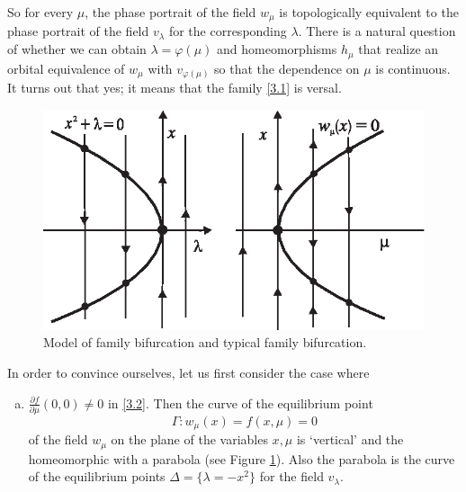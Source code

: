 \begin{example}
	So for every $\mu $, the phase portrait of the field $w_{\mu }$ is topologically equivalent to the phase portrait of the field $v_{\lambda }$ for the corresponding $\lambda$. There is a natural question of whether we can obtain $\lambda =\varphi (\mu )$ and homeomorphisms $h_{\mu }$ that realize an orbital equivalence of $w_{\mu }$ with $v_{\varphi (\mu)}$ so that the dependence on $\mu $ is continuous. It turns out that yes; it means that the family \eqref{3.1} is versal.

	\begin{figure}[!ht]
		\centering
		\includegraphics [scale=1.2]{jtr34}
		\caption{Model of family bifurcation and typical family bifurcation.}
		\label{fig:3.4}
	\end{figure}

	In order to convince ourselves, let us first consider the case where
	\begin{enumerate}[(a)]
		\item $\frac{\partial f}{\partial \mu }(0,0)\not=0$ in \eqref{3.2}. Then the curve of the equilibrium point
		$$
		\Gamma :w_{\mu }(x)=f(x,\mu )=0
		$$
		of the field $w_{\mu }$ on the plane of the variables $x,\mu $ is `vertical' and the homeomorphic with a parabola (see Figure \ref{fig:3.4}). Also the parabola is the curve of the equilibrium points $\Delta =\{\lambda =-x^{2}\}$ for the field $v_{\lambda }$.
		

\end{enumerate}
\end{example}
